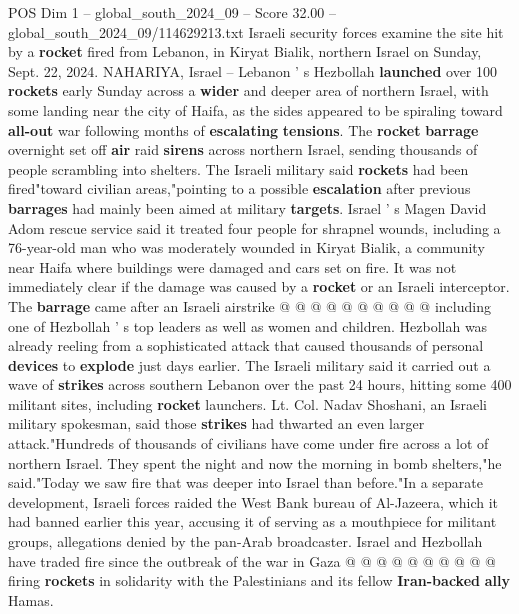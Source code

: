 \begin{textsample}{POS Dim 1 – global\_south\_2024\_09 – Score 32.00 – global\_south\_2024\_09/114629213.txt}  \label{ex:f1_pos_034}
Israeli security forces examine the site hit by a \textbf{rocket} fired from Lebanon, in Kiryat Bialik, northern Israel on Sunday, Sept. 22, 2024.
NAHARIYA, Israel -- Lebanon ' s Hezbollah \textbf{launched} over 100 \textbf{rockets} early Sunday across a \textbf{wider} and deeper area of northern Israel, with some landing near the city of Haifa, as the sides appeared to be spiraling toward \textbf{all-out} war following months of \textbf{escalating} \textbf{tensions}.
The \textbf{rocket} \textbf{barrage} overnight set off \textbf{air} raid \textbf{sirens} across northern Israel, sending thousands of people scrambling into shelters.
The Israeli military said \textbf{rockets} had been fired"toward civilian areas,"pointing to a possible \textbf{escalation} after previous \textbf{barrages} had mainly been aimed at military \textbf{targets}.
Israel ' s Magen David Adom rescue service said it treated four people for shrapnel wounds, including a 76-year-old man who was moderately wounded in Kiryat Bialik, a community near Haifa where buildings were damaged and cars set on fire.
It was not immediately clear if the damage was caused by a \textbf{rocket} or an Israeli interceptor.
The \textbf{barrage} came after an Israeli airstrike @ @ @ @ @ @ @ @ @ @ including one of Hezbollah ' s top leaders as well as women and children.
Hezbollah was already reeling from a sophisticated attack that caused thousands of personal \textbf{devices} to \textbf{explode} just days earlier.
The Israeli military said it carried out a wave of \textbf{strikes} across southern Lebanon over the past 24 hours, hitting some 400 militant sites, including \textbf{rocket} launchers.
Lt.
Col.
Nadav Shoshani, an Israeli military spokesman, said those \textbf{strikes} had thwarted an even larger attack."Hundreds of thousands of civilians have come under fire across a lot of northern Israel.
They spent the night and now the morning in bomb shelters,"he said."Today we saw fire that was deeper into Israel than before."In a separate development, Israeli forces raided the West Bank bureau of Al-Jazeera, which it had banned earlier this year, accusing it of serving as a mouthpiece for militant groups, allegations denied by the pan-Arab broadcaster.
Israel and Hezbollah have traded fire since the outbreak of the war in Gaza @ @ @ @ @ @ @ @ @ @ firing \textbf{rockets} in solidarity with the Palestinians and its fellow \textbf{Iran-backed} \textbf{ally} Hamas.

\end{textsample}
